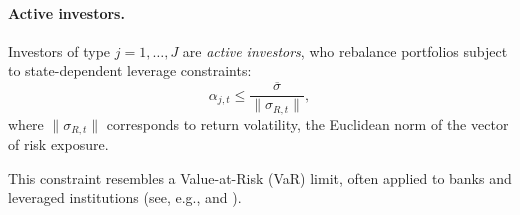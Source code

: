 

\paragraph{Active investors.} 

Investors of type $j = 1,\ldots, J$ are \textit{active investors}, who rebalance portfolios subject to state-dependent leverage constraints:  
\begin{equation}\label{eq:leverage_constraint}
    \alpha_{j,t} \leq \frac{\overline{\sigma}}{\|\sigma_{R,t}\|},
\end{equation}
where $\|\sigma_{R,t}\|$ corresponds to return volatility, the Euclidean norm of the vector of risk exposure.  

This constraint resembles a Value-at-Risk (VaR) limit, often applied to banks and leveraged institutions (see, e.g., \citealt{adrian2014procyclical} and \citealt{brunnermeier2009market}). 

